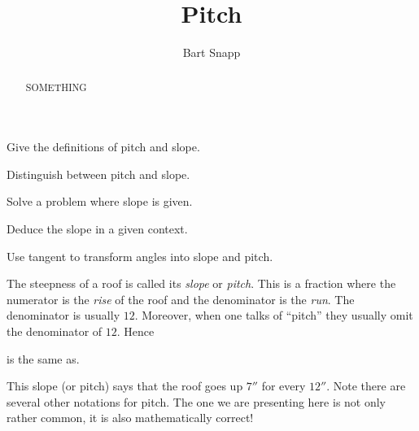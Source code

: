 \documentclass{ximera}
\title{Pitch}
\author{Bart Snapp}
\begin{document}
\begin{abstract}
  SOMETHING
\end{abstract}
\maketitle

\begin{listOutcomes}
\item Give the definitions of pitch and slope.
\item Distinguish between pitch and slope.
\item Solve a problem where slope is given.
\item Deduce the slope in a given context.
\item Use tangent to transform angles into slope and pitch.
\end{listOutcomes}



The steepness of a roof is called its \textit{slope} or
\textit{pitch}. This is a fraction where the numerator is the
\textit{rise} of the roof and the denominator is the \textit{run}. The
denominator is usually $12$. Moreover, when one talks of ``pitch''
they usually omit the denominator of $12$. Hence
\begin{center}
\quad is the same as\quad {}.
\end{center}
This slope (or pitch) says that the roof goes up $7''$ for every
$12''$. Note there are several other notations for pitch. The one we
are presenting here is not only rather common, it is also
mathematically correct!
\end{document}
